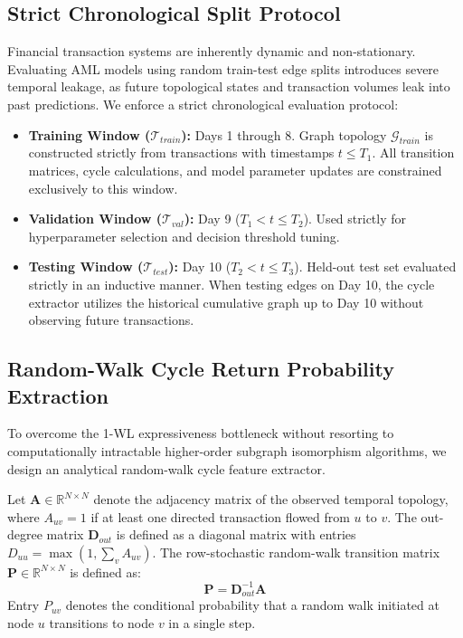 \documentclass[10pt,twocolumn]{article}
\begin{document}
\subsection{Strict Chronological Split Protocol}
Financial transaction systems are inherently dynamic and non-stationary. Evaluating AML models using random train-test edge splits introduces severe temporal leakage, as future topological states and transaction volumes leak into past predictions. We enforce a strict chronological evaluation protocol:
\begin{itemize}
    \item \textbf{Training Window ($\mathcal{T}_{train}$):} Days 1 through 8. Graph topology $\mathcal{G}_{train}$ is constructed strictly from transactions with timestamps $t \le T_1$. All transition matrices, cycle calculations, and model parameter updates are constrained exclusively to this window.
    \item \textbf{Validation Window ($\mathcal{T}_{val}$):} Day 9 ($T_1 < t \le T_2$). Used strictly for hyperparameter selection and decision threshold tuning.
    \item \textbf{Testing Window ($\mathcal{T}_{test}$):} Day 10 ($T_2 < t \le T_3$). Held-out test set evaluated strictly in an inductive manner. When testing edges on Day 10, the cycle extractor utilizes the historical cumulative graph up to Day 10 without observing future transactions.
\end{itemize}

\subsection{Random-Walk Cycle Return Probability Extraction}
To overcome the 1-WL expressiveness bottleneck without resorting to computationally intractable higher-order subgraph isomorphism algorithms, we design an analytical random-walk cycle feature extractor. 

Let $\mathbf{A} \in \mathbb{R}^{N \times N}$ denote the adjacency matrix of the observed temporal topology, where $A_{uv} = 1$ if at least one directed transaction flowed from $u$ to $v$. The out-degree matrix $\mathbf{D}_{out}$ is defined as a diagonal matrix with entries $D_{uu} = \max\left(1, \sum_v A_{uv}\right)$. The row-stochastic random-walk transition matrix $\mathbf{P} \in \mathbb{R}^{N \times N}$ is defined as:
\begin{equation}
    \mathbf{P} = \mathbf{D}_{out}^{-1} \mathbf{A}
    \label{eq:transition}
\end{equation}
Entry $P_{uv}$ denotes the conditional probability that a random walk initiated at node $u$ transitions to node $v$ in a single step.
\end{document}
